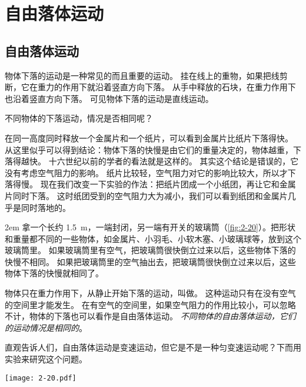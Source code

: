 \section{自由落体运动}
\subsection{自由落体运动}
物体下落的运动是一种常见的而且重要的运动。
挂在线上的重物，如果把线剪断，它在重力的作用下就沿着竖直方向下落。
从手中释放的石块，在重力作用下也沿着竖直方向下落。
可见物体下落的运动是直线运动。

不同物体的下落运动，情况是否相同呢？

在同一高度同时释放一个金属片和一个纸片，可以看到金属片比纸片下落得快。
从这里似乎可以得到结论：物体下落的快慢是由它们的重量决定的，物体越重，下落得越快。
十六世纪以前的学者的看法就是这样的。
其实这个结论是错误的，它没有考虑空气阻力的影响。
纸片比较轻，空气阻力对它的影响比较大，所以才下落得慢。
现在我们改变一下实验的作法：把纸片团成一个小纸团，再让它和金属片同时下落。
这时纸团受到的空气阻力大为减小，我们可以看到纸团和金属片几乎是同时落地的。

\par\medskip\noindent
\begin{minipage}{0.8\linewidth}\parindent2em
拿一个长约 \qty{1.5}{m}，一端封闭，另一端有开关的玻璃筒（\cref{fig:2-20}）。把形状和重量都不同的一些物体，如金属片、小羽毛、小软木塞、小玻璃球等，放到这个玻璃筒里。
如果玻璃筒里有空气，把玻璃筒很快倒立过来以后，这些物体下落的快慢不相同。
如果把玻璃筒里的空气抽出去，把玻璃筒很快倒立过来以后，这些物体下落的快慢就相同了。

物体只在重力作用下，从静止开始下落的运动，叫做。
这种运动只有在没有空气的空间里才能发生。
在有空气的空间里，如果空气阻力的作用比较小，可以忽略不计，物体的下落也可以看作是自由落体运动。
\emph{不同物体的自由落体运动，它们的运动情况是相同的}。

直观告诉人们，自由落体运动是变速运动，但它是不是一种匀变速运动呢？下而用实验来研究这个问题。
\end{minipage}\hfill
\begin{minipage}{0.15\linewidth}\centering
  \begin{figurehere}
    \texttt{[image: 2-20.pdf]}
    \caption{}
    \label{fig:2-20}
  \end{figurehere}
\end{minipage}

